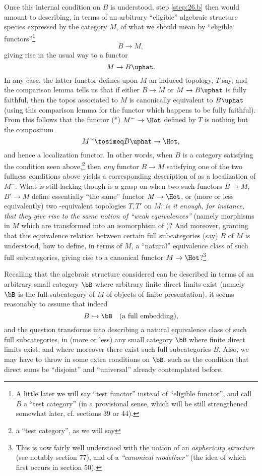 Once this internal condition on $B$ is understood, step
\ref{step:26.b} then would amount to describing, in terms of an arbitrary
``eligible'' algebraic structure species expressed by the category
$M$, of what we should mean by ``eligible functors''\footnote{A little later we will say ``test functor'' instead of ``eligible functor'', and call $B$ a ``test category'' (in a provisional sense, which will be still strengthened somewhat later, cf. sections 39 or 44).}
\[ B \to M,\]
giving rise in the usual way to a functor
\[ M \to B\uphat.\]
In any case, the latter functor defines upon $M$ an induced topology,
$T$ say, and the comparison lemma tells us that if either $B \to M$ or
$M\to B\uphat$ is fully faithful, then the topos associated to $M$
is canonically equivalent to $B\uphat$ (using this comparison lemma
for the functor which happens to be fully faithful). From this follows
that the functor (*) $M^{\sim} \to \Hot$ defined by
$T$ is nothing but the compositum 
\[ M^\sim \tosimeq B\uphat \to \Hot,\]
and hence a localization functor. In other words, when $B$ is a
category satisfying the condition seen above,\footnote{a ``test
  category'', as we will say} then \emph{any} functor
$B \to M$ satisfying one of the two fullness conditions above yields a
corresponding description of \Hot{} as a localization of $M^\sim$. What
is still lacking though is a grasp on when two such functors $B \to
M$, $B' \to M$ define essentially ``the same'' functor $M \to
\Hot$, or (more or less equivalently) two \Hot{}-equivalent
topologies $T,T'$ on $M$; \emph{is it enough, for instance, that they give rise to the same notion of ``weak equivalences''} (namely morphisms in
$M$ which are transformed into an isomorphism of \Hot{})? And moreover,
granting that this equivalence relation between certain full
subcategories (say) $B$ of $M$ is understood, how to define, in terms
of $M$, a ``natural'' equivalence class of such full subcategories,
giving rise to a canonical functor $M\to\Hot$?\footnote{This is now fairly well understood with the notion of an \emph{asphericity structure} (see notably section 77), and of a \emph{``canonical modelizer''} (the idea of which first occurs in section 50).}

Recalling that the algebraic structure considered can be described in
terms of an arbitrary small category $\bB$ where arbitrary finite
direct limits exist (namely $\bB$ is the full subcategory of $M$ of
objects of finite presentation), it seems reasonably to assume that
indeed
\[B \hookrightarrow \bB \quad\text{(a full embedding)},\]
and the question transforms into describing a natural equivalence
class of such full subcategories, in (more or less) any small category
$\bB$ where finite direct limits exist, and where moreover there
exist such full subcategories $B$. Also, we may have to throw in some
extra conditions on $\bB$, such as the condition that direct sums
be ``disjoint'' and ``universal'' already contemplated before.

